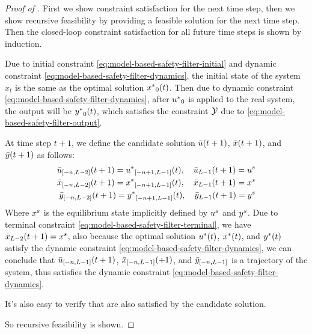 \begin{proof}[Proof of ]
    First we show constraint satisfaction for the next time step, then we show recursive feasibility by providing a feasible solution for the next time step.
    Then the closed-loop constraint satisfaction for all future time steps is shown by induction.

    Due to initial constraint \cref{eq:model-based-safety-filter-initial} and dynamic constraint \cref{eq:model-based-safety-filter-dynamics}, the initial state of the system $x_t$ is the same as the optimal solution ${x^*}_0(t)$.
    Then due to dynamic constraint \cref{eq:model-based-safety-filter-dynamics}, after ${u^*}_0$ is applied to the real system, the output will be ${y^*}_0(t)$, which satisfies the constraint $\mathcal{Y}$ due to \cref{eq:model-based-safety-filter-output}.

    At time step $t+1$, we define the candidate solution $\bar{u}(t+1)$, $\bar{x}(t+1)$, and $\bar{y}(t+1)$ as follows:
    {
    \setlength{\abovedisplayskip}{3pt}
    \setlength{\belowdisplayskip}{3pt}
    \begin{align*}
        \bar{u}_{\left[ -n, L-2 \right]}(t+1) = {u^*}_{\left[ -n+1, L-1 \right]}(t), \quad \bar{u}_{L-1}(t+1) = {u^s} \\
        \bar{x}_{\left[ -n, L-2 \right]}(t+1) = {x^*}_{\left[ -n+1, L-1 \right]}(t), \quad \bar{x}_{L-1}(t+1) = {x^s} \\
        \bar{y}_{\left[ -n, L-2 \right]}(t+1) = {y^*}_{\left[ -n+1, L-1 \right]}(t), \quad \bar{y}_{L-1}(t+1) = {y^s}
    \end{align*}
    }
    Where ${x^s}$ is the equilibrium state implicitly defined by ${u^s}$ and ${y^s}$.
    Due to terminal constraint \cref{eq:model-based-safety-filter-terminal}, we have $\bar{x}_{L-2}(t+1) = {x^s}$, also because the optimal solution ${u^*}(t)$, ${x^*}(t)$, and ${y^*}(t)$ satisfy the dynamic constraint \cref{eq:model-based-safety-filter-dynamics}, we can conclude that $\bar{u}_{\left[ -n, L-1 \right]}(t+1)$, $\bar{x}_{\left[ -n, L-1 \right]}(+1)$, and $\bar{y}_{\left[ -n, L-1 \right]}$ is a trajectory of the system, thus satisfies the dynamic constraint \cref{eq:model-based-safety-filter-dynamics}.

    It's also easy to verify that  are also satisfied by the candidate solution.

    So recursive feasibility is shown.
\end{proof}

